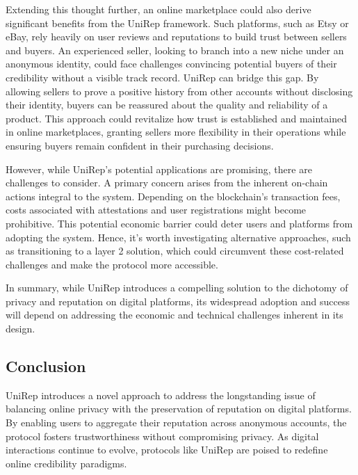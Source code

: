 \documentclass[11pt]{article}
\begin{document}
Extending this thought further, an online marketplace could also derive significant benefits from the UniRep framework. Such platforms, such as Etsy or eBay, rely heavily on user reviews and reputations to build trust between sellers and buyers. An experienced seller, looking to branch into a new niche under an anonymous identity, could face challenges convincing potential buyers of their credibility without a visible track record. UniRep can bridge this gap. By allowing sellers to prove a positive history from other accounts without disclosing their identity, buyers can be reassured about the quality and reliability of a product. This approach could revitalize how trust is established and maintained in online marketplaces, granting sellers more flexibility in their operations while ensuring buyers remain confident in their purchasing decisions.

However, while UniRep's potential applications are promising, there are challenges to consider. A primary concern arises from the inherent on-chain actions integral to the system. Depending on the blockchain's transaction fees, costs associated with attestations and user registrations might become prohibitive. This potential economic barrier could deter users and platforms from adopting the system. Hence, it's worth investigating alternative approaches, such as transitioning to a layer 2 solution, which could circumvent these cost-related challenges and make the protocol more accessible.

In summary, while UniRep introduces a compelling solution to the dichotomy of privacy and reputation on digital platforms, its widespread adoption and success will depend on addressing the economic and technical challenges inherent in its design.
\subsection{Conclusion}
\label{sec:org05cf500}

UniRep introduces a novel approach to address the longstanding issue of balancing online privacy with the preservation of reputation on digital platforms. By enabling users to aggregate their reputation across anonymous accounts, the protocol fosters trustworthiness without compromising privacy. As digital interactions continue to evolve, protocols like UniRep are poised to redefine online credibility paradigms.
\end{document}
